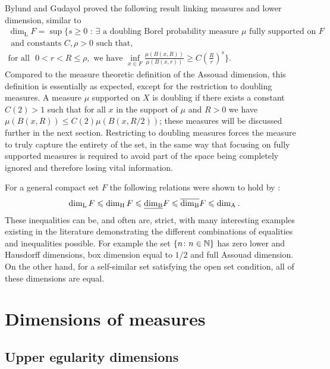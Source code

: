 Bylund and Gudayol \cite{bylund-g} proved the following result linking measures and lower dimension, similar to \cite{luksak-saksman, konyagin-volberg}
\begin{multline*}
\dim_{\text{L}} F = \sup \Bigg\{ s \geq 0 \, \,  : \, \exists \text{ a doubling Borel probability measure } \mu \text{ fully supported on }F \\ \text{ and constants }C, \rho > 0  \text{ such that, } \\ \text{for all } \, \, 0< r< R \leq \rho, \text{ we have  }\inf_{x\in F} \frac{\mu(B(x,R))}{\mu(B(x,r))} \geq C\left(\frac{R}{r}\right)^{s} \Bigg\}.
\end{multline*}
Compared to the measure theoretic definition of the Assouad dimension, this definition is essentially as expected, except for the restriction to doubling measures. A measure $\mu$ supported on $X$ is doubling if there exists a constant $C(2) > 1$ such that for all $x$ in the support of $\mu$ and $R > 0$ we have $\mu( B(x,R)) \le C(2) \mu(B(x,R/2))$; these measures will be discussed further in the next section. Restricting to doubling measures forces the measure to truly capture the entirety of the set, in the same way that focusing on fully supported measures is required to avoid part of the space being completely ignored and therefore losing vital information.


For a general compact set $F$ the following relations were shown to hold by \cite{fraser, larman1, larman2}:
\[
\dim_{\mathrm{L}} F \leqslant \dim_{\text{H}} F \leqslant \underline{\dim_{\mathrm{B}}} F \leqslant \overline{\dim_{\mathrm{B}}} F \leqslant \dim_{\mathrm{A}}.
\]
These inequalities can be, and often are, strict, with many interesting examples existing in the literature demonstrating the different combinations of equalities and inequalities possible. For example the set $\left\{\/n \colon n \in \mathbb{N} \right\}$ has zero lower and Hausdorff dimensions, box dimension equal to $1/2$ and full Assouad dimension. On the other hand, for a self-similar set satisfying the open set condition, all of these dimensions are equal. 







\section{Dimensions of measures}
\label{sec:intro-measures}

\subsection{Upper egularity dimensions}
\label{sec:intro-upper-reg}

